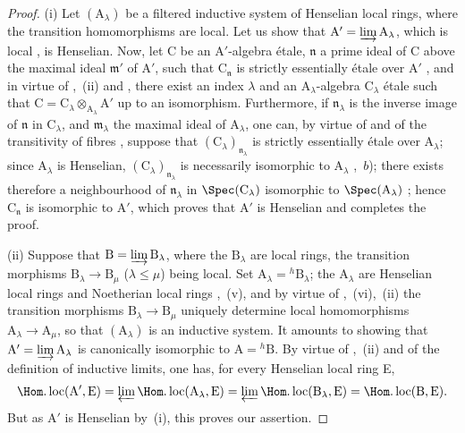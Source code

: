 \begin{proof}
(i) Let $(\mathrm{A}_\lambda)$ be a filtered inductive system of Henselian local rings, where the transition homomorphisms are local.
Let us show that $\mathrm{A}'=\varinjlim\mathrm{A}_\lambda$, which is local , is Henselian.
Now, let C be an $\mathrm{A}'$-algebra \'{e}tale, $\mathfrak{n}$ a prime ideal
of C above the maximal ideal $\mathfrak{m}'$ of $\mathrm{A}'$, such that $\mathrm{C}_{\mathfrak{n}}$ is strictly essentially \'{e}tale over $\mathrm{A}'$ , and in virtue of ,~(ii) and , there exist an index $\lambda$ and an $\mathrm{A}_\lambda$-algebra $\mathrm{C}_\lambda$ \'{e}tale such that $\mathrm{C}=\mathrm{C}_\lambda\otimes_{\mathrm{A}_\lambda}\mathrm{A}'$ up to an isomorphism.
Furthermore, if $\mathfrak{n}_\lambda$ is the inverse image of $\mathfrak{n}$ in $\mathrm{C}_\lambda$, and $\mathfrak{m}_\lambda$ the maximal ideal of $\mathrm{A}_\lambda$, one can, by virtue of  and of the transitivity of fibres , suppose that $(\mathrm{C}_\lambda)_{\mathfrak{n}_\lambda}$ is strictly essentially \'{e}tale over $\mathrm{A}_\lambda$;
since $\mathrm{A}_\lambda$ is Henselian, $(\mathrm{C}_\lambda)_{\mathfrak{n}_\lambda}$ is necessarily isomorphic to $\mathrm{A}_\lambda$ ,~$b$);
there exists therefore a neighbourhood of $\mathfrak{n}_\lambda$ in $\Spec(\mathrm{C}_\lambda)$ isomorphic to $\Spec(\mathrm{A}_\lambda)$ ;
hence $\mathrm{C}_\mathfrak{n}$ is isomorphic to $\mathrm{A}'$, which proves that $\mathrm{A}'$ is Henselian  and completes the proof.

(ii) Suppose that $\mathrm{B}=\varinjlim\mathrm{B}_\lambda$, where the $\mathrm{B}_\lambda$ are local rings, the transition morphisms $\mathrm{B}_\lambda\to\mathrm{B}_\mu$ ($\lambda\leq\mu$) being local.
Set $\mathrm{A}_\lambda={}^h\!\mathrm{B}_\lambda$;
the $\mathrm{A}_\lambda$ are Henselian local rings and Noetherian local rings ,~(v), and by virtue of ,~(vi),~(ii) the transition morphisms $\mathrm{B}_\lambda\to\mathrm{B}_\mu$ uniquely determine local homomorphisms $\mathrm{A}_\lambda\to\mathrm{A}_\mu$, so that $(\mathrm{A}_\lambda)$ is an inductive system.
It amounts to showing that $\mathrm{A}'=\varinjlim\mathrm{A}_\lambda$ is canonically isomorphic to $\mathrm{A}={}^h\!\mathrm{B}$.
By virtue of ,~(ii) and of the definition of inductive limits, one has, for every Henselian local ring E,
\[
  \Hom.\operatorname{loc}(\mathrm{A}',\mathrm{E})=\varprojlim\Hom.\operatorname{loc}(\mathrm{A}_\lambda,\mathrm{E})=\varprojlim\Hom.\operatorname{loc}(\mathrm{B}_\lambda,\mathrm{E})=\Hom.\operatorname{loc}(\mathrm{B},\mathrm{E}).
\]
But as $\mathrm{A}'$ is Henselian by~(i), this proves our assertion.


\end{proof}
